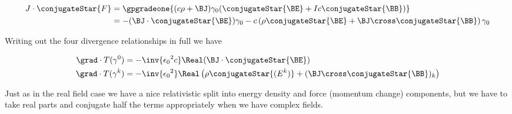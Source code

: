 \begin{align*}
J \cdot \conjugateStar{F} 
&=
\gpgradeone{ (c\rho + \BJ) \gamma_0 ( \conjugateStar{\BE} + I c \conjugateStar{\BB} ) } \\
&=
- (\BJ \cdot \conjugateStar{\BE} ) \gamma_0
- c \left( 
\rho \conjugateStar{\BE} 
+ \BJ \cross \conjugateStar{\BB}
\right) \gamma_0
\end{align*}

Writing out the four divergence relationships in full we have

\begin{subequations}
\begin{align}\label{eqn:complexFieldEnergy:11}
\grad \cdot T(\gamma^0) &= - \inv{ {\epsilon_0}^2 c } \Real( \BJ \cdot \conjugateStar{\BE} ) \\
\grad \cdot T(\gamma^k) &= - \inv{ {\epsilon_0}^2 } \Real \left( \rho \conjugateStar{(E^k)} + (\BJ \cross \conjugateStar{\BB})_k \right)
\end{align}
\end{subequations}

Just as in the real field case we have a nice relativistic split into energy density and force (momentum change) components, but we have to take real parts and conjugate half the terms appropriately when we have complex fields.

\EndArticle
